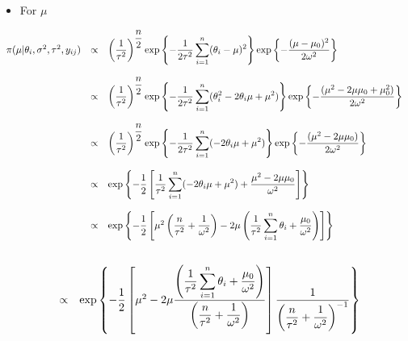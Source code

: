\documentclass[a4paper, 11pt]{article}
\begin{document}
\begin{itemize}
\item For $\mu$
\end{itemize}
\begin{equation*}
\begin{array}{lcl ll }

\pi(\mu|\theta_i, \sigma^2, \tau^2, y_{ij}) & \propto & \left(\dfrac{1}{\tau^2}\right)^{\dfrac{n}{2}}\mbox{exp}\left\{ - \dfrac{1}{2\tau^2} 
\displaystyle\sum_{i=1}^{n} (\theta_i - \mu)^2\right\} \mbox{exp}\left\{ - \dfrac{(\mu - \mu_0)^2}{2\omega^2}\right\}  \\ \\

& \propto & \left(\dfrac{1}{\tau^2}\right)^{\dfrac{n}{2}}\mbox{exp}\left\{ - \dfrac{1}{2\tau^2} 
\displaystyle\sum_{i=1}^{n} (\theta_i^2 - 2\theta_i\mu + \mu^2)\right\} \mbox{exp}\left\{ - \dfrac{(\mu^2 - 2\mu\mu_0 + \mu_0^2)}{2\omega^2}\right\}  \\ \\

& \propto & \left(\dfrac{1}{\tau^2}\right)^{\dfrac{n}{2}}\mbox{exp}\left\{ - \dfrac{1}{2\tau^2} 
\displaystyle\sum_{i=1}^{n} (- 2\theta_i\mu + \mu^2)\right\} \mbox{exp}\left\{ - \dfrac{(\mu^2 - 2\mu\mu_0)}{2\omega^2}\right\}  \\ \\

& \propto & \mbox{exp}\left\{ - \dfrac{1}{2} \left[ \dfrac{1}{\tau^2} \displaystyle\sum_{i=1}^{n} (- 2\theta_i\mu + \mu^2) + \dfrac{\mu^2 - 2\mu\mu_0}{\omega^2} \right] \right\} \\ \\

& \propto & \mbox{exp}\left\{ - \dfrac{1}{2} \left[ \mu^2 \left( \dfrac{n}{\tau^2} +\dfrac{1}{\omega^2} \right) - 2\mu \left(\dfrac{1}{\tau^2}\displaystyle\sum_{i=1}^{n} \theta_i + \dfrac{\mu_0}{\omega^2} \right) \right] \right\} \\ \\

 \end{array}
\end{equation*}


\begin{equation*}
\begin{array}{lcl ll }

& \propto & \mbox{exp}\left\{ - \dfrac{1}{2} \left[ \mu^2 - 2\mu \dfrac{ \left(\dfrac{1}{\tau^2}\displaystyle\sum_{i=1}^{n} \theta_i + \dfrac{\mu_0}{\omega^2} \right)}{\left( \dfrac{n}{\tau^2} +\dfrac{1}{\omega^2} \right)} \right] \dfrac{1}{\left( \dfrac{n}{\tau^2} +\dfrac{1}{\omega^2} \right)^{-1}}\right\} \\ \\

 \end{array}
\end{equation*}
\end{document}
